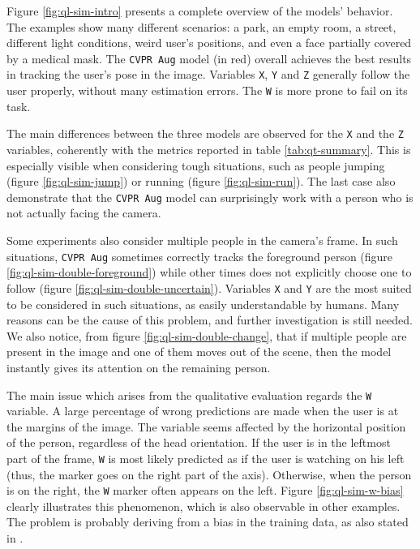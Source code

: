 Figure \ref{fig:ql-sim-intro} presents a complete overview of the models' behavior. The examples show many different scenarios: a park, an empty room, a street, different light conditions, weird user's positions, and even a face partially covered by a medical mask. The \texttt{CVPR Aug} model (in red) overall achieves the best results in tracking the user's pose in the image. Variables \texttt{X}, \texttt{Y} and \texttt{Z} generally follow the user properly, without many estimation errors. The \texttt{W} is more prone to fail on its task.

\medskip

The main differences between the three models are observed for the \texttt{X} and the \texttt{Z} variables, coherently with the metrics reported in table \ref{tab:qt-summary}. This is especially visible when considering tough situations, such as people jumping (figure \ref{fig:ql-sim-jump}) or running (figure \ref{fig:ql-sim-run}). The last case also demonstrate that the \texttt{CVPR Aug} model can surprisingly work with a person who is not actually facing the camera.

Some experiments also consider multiple people in the camera's frame. In such situations, \texttt{CVPR Aug} sometimes correctly tracks the foreground person (figure \ref{fig:ql-sim-double-foreground}) while other times does not explicitly choose one to follow (figure \ref{fig:ql-sim-double-uncertain}). Variables \texttt{X} and \texttt{Y} are the most suited to be considered in such situations, as easily understandable by humans. Many reasons can be the cause of this problem, and further investigation is still needed. We also notice, from figure \ref{fig:ql-sim-double-change}, that if multiple people are present in the image and one of them moves out of the scene, then the model instantly gives its attention on the remaining person.


The main issue which arises from the qualitative evaluation regards the \texttt{W} variable. A large percentage of wrong predictions are made when the user is at the margins of the image. The variable seems affected by the horizontal position of the person, regardless of the head orientation. If the user is in the leftmost part of the frame, \texttt{W} is most likely predicted as if the user is watching on his left (thus, the marker goes on the right part of the axis). Otherwise, when the person is on the right, the \texttt{W} marker often appears on the left. Figure \ref{fig:ql-sim-w-bias} clearly illustrates this phenomenon, which is also observable in other examples. The problem is probably deriving from a bias in the training data, as also stated in \cite{mantegazza2018thesis}.

